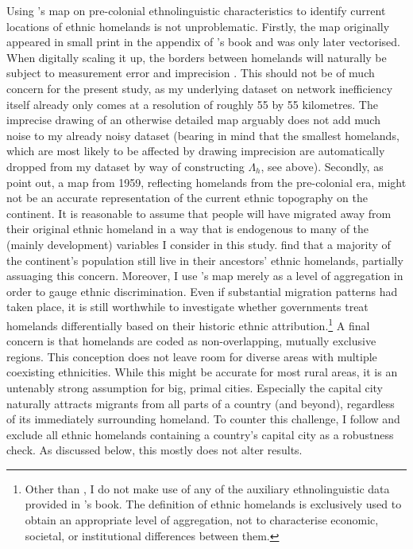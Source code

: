 \documentclass[11pt, oneside]{article}   	%
\begin{document}
Using \citeauthor{Murdock_Africaitspeoples_1959}'s map on pre-colonial ethnolinguistic characteristics to identify current locations of ethnic homelands is not unproblematic. Firstly, the map originally appeared in small print in the appendix of \citeauthor{Murdock_Africaitspeoples_1959}'s book and was only later vectorised. When digitally scaling it up, the borders between homelands will naturally be subject to measurement error and imprecision \citep{Michalopoulos_PreColonialEthnicInstitutions_2013}. This should not be of much concern for the present study, as my underlying dataset on network inefficiency itself already only comes at a resolution of roughly 55 by 55 kilometres. The imprecise drawing of an otherwise detailed map arguably does not add much noise to my already noisy dataset (bearing in mind that the smallest homelands, which are most likely to be affected by drawing imprecision are automatically dropped from my dataset by way of constructing $\Lambda_{h}$, see above). Secondly, as \cite{Michalopoulos_PreColonialEthnicInstitutions_2013} point out, a map from 1959, reflecting homelands from the pre-colonial era, might not be an accurate representation of the current ethnic topography on the continent. It is reasonable to assume that people will have migrated away from their original ethnic homeland in a way that is endogenous to many of the (mainly development) variables I consider in this study. \cite{Nunn_SlaveTradeOrigins_2011} find that a majority of the continent's population still live in their ancestors' ethnic homelands, partially assuaging this concern. Moreover, I use \citeauthor{Murdock_Africaitspeoples_1959}'s map merely as a level of aggregation in order to gauge ethnic discrimination. Even if substantial migration patterns had taken place, it is still worthwhile to investigate whether governments treat homelands differentially based on their historic ethnic attribution.\footnote{Other than \cite{Michalopoulos_PreColonialEthnicInstitutions_2013,Michalopoulos_LongRunEffectsScramble_2016}, I do not make use of any of the auxiliary ethnolinguistic data provided in \citeauthor{Murdock_Africaitspeoples_1959}'s book. The definition of ethnic homelands is exclusively used to obtain an appropriate level of aggregation, not to characterise economic, societal, or institutional differences between them.} A final concern is that homelands are coded as non-overlapping, mutually exclusive regions. This conception does not leave room for diverse areas with multiple coexisting ethnicities. While this might be accurate for most rural areas, it is an untenably strong assumption for big, primal cities. Especially the capital city naturally attracts migrants from all parts of a country (and beyond), regardless of its immediately surrounding homeland. To counter this challenge, I follow \cite{Alesina_Ethnicinequality_2016} and exclude all ethnic homelands containing a country's capital city as a robustness check. As discussed below, this mostly does not alter results.
\end{document}
